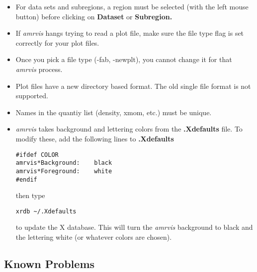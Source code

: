 \begin{itemize}

\item For data sets and subregions, a region must be selected (with
the left mouse button) before clicking on {\bf Dataset} or {\bf Subregion.}
    
\item If {\em amrvis} hangs trying to read a plot file, make sure the file type
flag is set correctly for your plot files.

\item Once you pick a file type (-fab, -newplt), you cannot change it for that
{\em amrvis} process.

\item Plot files have a new directory based format.  The old single file
format is not supported.

\item Names in the quantiy list (density, xmom, etc.) must be unique.

\item {\em amrvis} takes background and lettering colors from
the {\bf .Xdefaults} file.
To modify these, add the following lines to {\bf .Xdefaults}

\begin{verbatim}
#ifdef COLOR
amrvis*Background:    black
amrvis*Foreground:    white
#endif
\end{verbatim}

then type

\begin{verbatim}
xrdb ~/.Xdefaults
\end{verbatim}

to update the X database.  This will turn the {\em amrvis} background to black
and the lettering white (or whatever colors are chosen).

\end{itemize}


\subsection{Known Problems}

